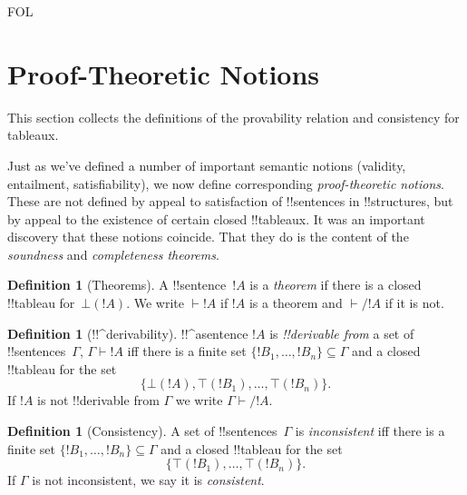 \documentclass[10pt,a4paper]{article}
\theoremstyle{plain}
\theoremstyle{definition}
\newtheorem{defn}[thm]{Definition}
\theoremstyle{remark}
\newenvironment{explain}{}{}
\newenvironment{editorial}{}{}
\newcommand*{\olfileid}[3]{}
\newcommand*{\olsection}[1]{\section*{#1}}
\providecommand{\Proves}{\mathrel{\vdash}}
\providecommand{\sFmla}[2]{#1(#2)}
\providecommand{\True}{\top}
\providecommand{\False}{\bot}
\providecommand{\iftag}[1]{#1}
\begin{document}



\iftag{FOL}
      {\olfileid{fol}{tab}{ptn}}
      {\olfileid{pl}{tab}{ptn}}
      
\olsection{Proof-Theoretic Notions}

\begin{editorial}
This section collects the definitions of the provability relation
and consistency for tableaux.
\end{editorial}

\begin{explain}
Just as we've defined a number of important semantic notions
(validity, entailment, satisfiability), we now define corresponding
\emph{proof-theoretic notions}.  These are not defined by appeal to
satisfaction of !!{sentence}s in !!{structure}s, but by appeal to the
existence of certain closed !!{tableau}x.  It was an important
discovery that these notions coincide.  That they do is the content of
the \emph{soundness} and \emph{completeness theorems}.
\end{explain}


\begin{defn}[Theorems]
A !!{sentence}~$!A$ is a \emph{theorem} if there is a closed
!!{tableau} for~$\sFmla{\False}{!A}$.  We write $\Proves !A$ if $!A$
is a theorem and $\Proves/ !A$ if it is not.
\end{defn}

\begin{defn}[!!^{derivability}]
!!^a{sentence} $!A$ is \emph{!!{derivable} from} a set of
!!{sentence}s~$\Gamma$, $\Gamma \Proves !A$ iff there is a
finite set $\{!B_1, \dots, !B_n\} \subseteq \Gamma$
and a closed !!{tableau} for the set
\[
\{
  \sFmla{\False}{!A},
  \sFmla{\True}{!B_1}, \dots,
  \sFmla{\True}{!B_n}
  \}.
\]
If $!A$ is not !!{derivable} from $\Gamma$ we write $\Gamma \Proves/
!A$.
\end{defn}

\begin{defn}[Consistency]
A set of !!{sentence}s~$\Gamma$ is \emph{inconsistent} iff there is a
finite set $\{!B_1, \dots, !B_n\} \subseteq \Gamma$ and a closed
!!{tableau} for the set
\[
\{
  \sFmla{\True}{!B_1}, \dots,
  \sFmla{\True}{!B_n}  
  \}.
\]
If $\Gamma$ is not inconsistent, we say it is \emph{consistent}.
\end{defn}
\end{document}
